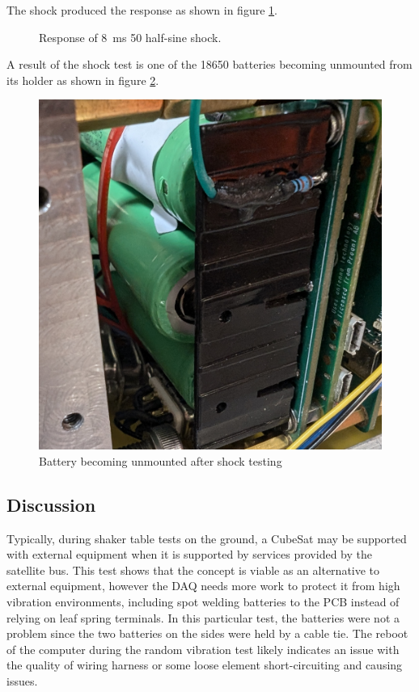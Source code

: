 \documentclass{report}
\begin{document}
The shock produced the response as shown in figure \ref{fig:shock-table-resp}.

\begin{figure}[H]
  \centering
  
  \caption{Response of \SI{8}{\milli\second} \SI{50}{\gacc} half-sine shock.}
  \label{fig:shock-table-resp}
\end{figure}

A result of the shock test is one of the 18650 batteries becoming unmounted from its holder as shown in figure \ref{fig:dislodged-battery}.

\begin{figure}[H]
  \centering
  \includegraphics[width=0.7\linewidth]{images/dislodged_battery.jpg}
  \caption{Battery becoming unmounted after shock testing}
  \label{fig:dislodged-battery}
\end{figure}

\subsection{Discussion}

Typically, during shaker table tests on the ground, a CubeSat may be supported with external equipment when it is supported by services provided by the satellite bus. This test shows that the concept is viable as an alternative to external equipment, however the DAQ needs more work to protect it from high vibration environments, including spot welding batteries to the PCB instead of relying on leaf spring terminals. In this particular test, the batteries were not a problem since the two batteries on the sides were held by a cable tie. The reboot of the computer during the random vibration test likely indicates an issue with the quality of wiring harness or some loose element short-circuiting and causing issues.
\end{document}
